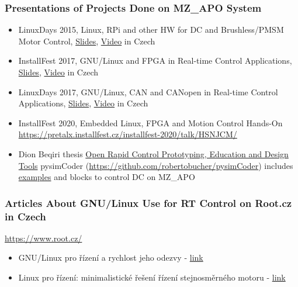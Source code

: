\documentclass{beamer}
\begin{document}
\begin{frame}
\frametitle{Presentations of Projects Done on MZ\_APO System}

\begin{itemize}
\item LinuxDays 2015, Linux, RPi and other HW for DC and Brushless/PMSM Motor Control,
\href{https://www.linuxdays.cz/2015/video/Pavel_Pisa-Rizeni_stejnosmernych_motoru.pdf}{Slides},
\href{https://youtu.be/uMfY-sKf0HA}{Video} in Czech

\item InstallFest 2017, GNU/Linux and FPGA in Real-time Control Applications,
\href{https://installfest.cz/if17/slides/so_t2_pisa_realtime.pdf}{Slides},
\href{https://youtu.be/sNtlEysC0yA}{Video} in Czech

\item  LinuxDays 2017, GNU/Linux, CAN and CANopen in Real-time Control
Applications,
\href{https://www.linuxdays.cz/2017/video/Pavel_Pisa-CAN_canopen.pdf}{Slides},
\href{https://youtu.be/hYC-XznyOlQ}{Video} in Czech

\item InstallFest 2020, Embedded Linux, FPGA and Motion Control Hands-On
\url{https://pretalx.installfest.cz/installfest-2020/talk/HSNJCM/}

\item Dion Beqiri thesis
\href{https://dspace.cvut.cz/bitstream/handle/10467/101599/F3-BP-2022-Beqiri-Dion-bachelor_thesis_DionBeqiri.pdf}{Open Rapid Control Prototyping, Education and Design Tools} pysimCoder
(\url{https://github.com/robertobucher/pysimCoder}) includes
\href{https://github.com/robertobucher/pysimCoder-examples/tree/main/Linux-mzapo/DCmotor}{examples}
and blocks to control DC on MZ\_APO

\end{itemize}

\end{frame}


\begin{frame}
\frametitle{Articles About GNU/Linux Use for RT Control on Root.cz in Czech}

\href{https://www.root.cz/}{https://www.root.cz/}

\begin{itemize}
\item
  GNU/Linux pro řízení a rychlost jeho odezvy -
  \href{https://www.root.cz/clanky/gnu-linux-pro-rizeni-a-rychlost-jeho-odezvy/}{link}
\item
  Linux pro řízení: minimalistické řešení řízení stejnosměrného mo­toru
  -
  \href{https://www.root.cz/clanky/linux-pro-rizeni-minimalisticke-reseni-rizeni-stejnosmerneho-motoru/}{link}
\end{itemize}

\end{frame}
\end{document}
